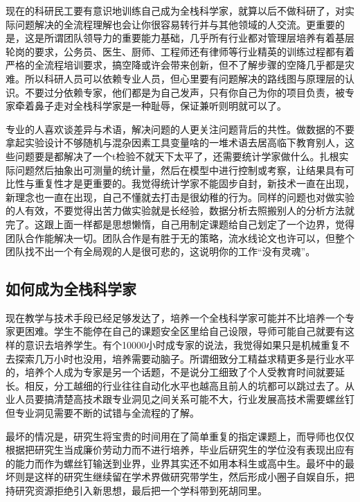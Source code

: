 \documentclass[
]{book}
\begin{document}
现在的科研民工要有意识地训练自己成为全栈科学家，就算以后不做科研了，对实际问题解决的全流程理解也会让你很容易转行并与其他领域的人交流。更重要的是，这是所谓团队领导力的重要能力基础，几乎所有行业都对管理层培养有着基层轮岗的要求，公务员、医生、厨师、工程师还有律师等行业精英的训练过程都有着严格的全流程培训要求，搞空降或许会带来创新，但不了解步骤的空降几乎都是灾难。所以科研人员可以依赖专业人员，但心里要有问题解决的路线图与原理层的认识。不要过分依赖专家，他们都是为自己发声，只有你自己为你的项目负责，被专家牵着鼻子走对全栈科学家是一种耻辱，保证兼听则明就可以了。

专业的人喜欢谈差异与术语，解决问题的人更关注问题背后的共性。做数据的不要拿起实验设计不够随机与混杂因素工具变量啥的一堆术语去居高临下教育别人，这些问题要是都解决了一个t检验不就天下太平了，还需要统计学家做什么。扎根实际问题然后抽象出可测量的统计量，然后在模型中进行控制或考察，让结果具有可比性与重复性才是更重要的。我觉得统计学家不能固步自封，新技术一直在出现，新理念也一直在出现，自己不懂就去打击是很幼稚的行为。同样的问题也对做实验的人有效，不要觉得出苦力做实验就是长经验，数据分析去照搬别人的分析方法就完了。这跟上面一样都是思想懒惰，自己用制定课题给自己划定了一个边界，觉得团队合作能解决一切。团队合作是有胜于无的策略，流水线论文也许可以，但整个团队找不出一个有全局观的人是很可悲的，这说明你的工作``没有灵魂''。

\hypertarget{ux5982ux4f55ux6210ux4e3aux5168ux6808ux79d1ux5b66ux5bb6}{%
\subsection{如何成为全栈科学家}\label{ux5982ux4f55ux6210ux4e3aux5168ux6808ux79d1ux5b66ux5bb6}}

现在教学与技术手段已经足够发达了，培养一个全栈科学家可能并不比培养一个专家更困难。学生不能停在自己的课题安全区里给自己设限，导师可能自己就要有这样的意识去培养学生。有个10000小时成专家的说法，我觉得如果只是机械重复不去探索几万小时也没用，培养需要动脑子。所谓细致分工精益求精更多是行业水平的，培养个人成为专家是另一个话题，不是说分工细致了个人受教育时间就要延长。相反，分工越细的行业往往自动化水平也越高且前人的坑都可以跳过去了。从业人员要搞清楚高技术跟专业洞见之间关系可能不大，行业发展高技术需要螺丝钉但专业洞见需要不断的试错与全流程的了解。

最坏的情况是，研究生将宝贵的时间用在了简单重复的指定课题上，而导师也仅仅根据把研究生当成廉价劳动力而不进行培养，毕业后研究生的学位没有表现出应有的能力而作为螺丝钉输送到业界，业界其实还不如用本科生或高中生。最坏中的最坏则是这样的研究生继续留在学术界做研究带学生，然后形成小圈子自娱自乐，把持研究资源拒绝引入新思想，最后把一个学科带到死胡同里。
\end{document}
